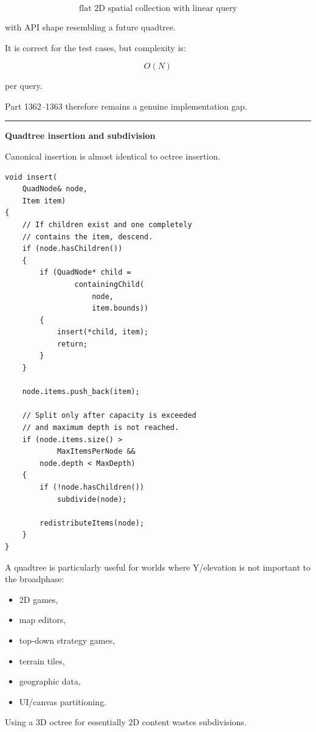\[
\boxed{
\text{flat 2D spatial collection with linear query}
}
\]

with API shape resembling a future quadtree.

It is correct for the test cases, but complexity is:

\[
O(N)
\]

per query.

Part 1362--1363 therefore remains a genuine implementation gap.

\begin{center}\rule{0.5\linewidth}{0.5pt}\end{center}

\textbf{Quadtree insertion and subdivision}

Canonical insertion is almost identical to octree insertion.

\begin{verbatim}
void insert(
    QuadNode& node,
    Item item)
{
    // If children exist and one completely
    // contains the item, descend.
    if (node.hasChildren())
    {
        if (QuadNode* child =
                containingChild(
                    node,
                    item.bounds))
        {
            insert(*child, item);
            return;
        }
    }

    node.items.push_back(item);

    // Split only after capacity is exceeded
    // and maximum depth is not reached.
    if (node.items.size() >
            MaxItemsPerNode &&
        node.depth < MaxDepth)
    {
        if (!node.hasChildren())
            subdivide(node);

        redistributeItems(node);
    }
}
\end{verbatim}

A quadtree is particularly useful for worlds where Y/elevation is not important to the broadphase:

\begin{itemize}
\tightlist
\item
  2D games,
\item
  map editors,
\item
  top-down strategy games,
\item
  terrain tiles,
\item
  geographic data,
\item
  UI/canvas partitioning.
\end{itemize}

Using a 3D octree for essentially 2D content wastes subdivisions.

